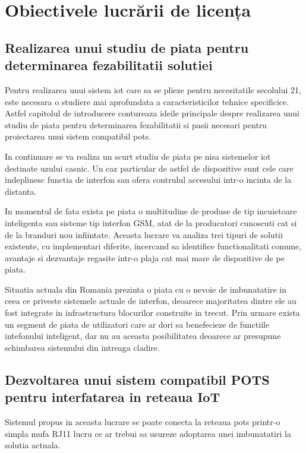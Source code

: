 \section {Obiectivele lucrării de licența}

\subsection {Realizarea unui studiu de piata pentru determinarea fezabilitatii solutiei}

Pentru realizarea unui sistem \acrfull{iot} care sa se plieze pentru necesitatile secolului 21, este necesara o studiere mai aprofundata a caracteristicilor tehnice specificice. Astfel capitolul de introducere contureaza ideile principale despre realizarea unui studiu de piata pentru determinarea fezabilitatii si pasii necesari pentru proiectarea unui sistem compatibil \acrshort{pots}.

In continuare se va realiza un scurt studiu de piata pe nisa sistemelor \acrshort{iot} destinate uzului casnic. Un caz particular de astfel de dispozitive sunt cele care indeplinesc functia de interfon sau ofera contrulul accesului intr-o incinta de la distanta.

In momentul de fata exista pe piata o multitudine de produse de tip incuietoare inteligenta sau sisteme tip interfon GSM, atat de la producatori cunoscuti cat si de la branduri nou infiintate. Aceasta lucrare va analiza trei tipuri de solutii existente, cu implementari diferite, incercand sa identifice functionalitati comune, avantaje si dezvantaje regasite intr-o plaja cat mai mare de dispozitive de pe piata.

Situatia actuala din Romania prezinta o piata cu o nevoie de imbunatatire in ceea ce priveste sistemele actuale de interfon, deoarece majoritatea dintre ele au fost integrate in infrastructura blocurilor construite in trecut. Prin urmare exista un segment de piata de utilizatori care ar dori sa benefecieze de functiile intefonului inteligent, dar nu au aceasta posibilitatea deoarece ar presupune schimbarea sistemului din intreaga cladire.


\subsection {Dezvoltarea unui sistem compatibil POTS pentru interfatarea in reteaua IoT}

Sistemul propus in aceasta lucrare se poate conecta la reteaua \acrfull{pots} printr-o simpla mufa RJ11 lucru ce ar trebui sa usureze adoptarea unei imbunatatiri la solutia actuala.



